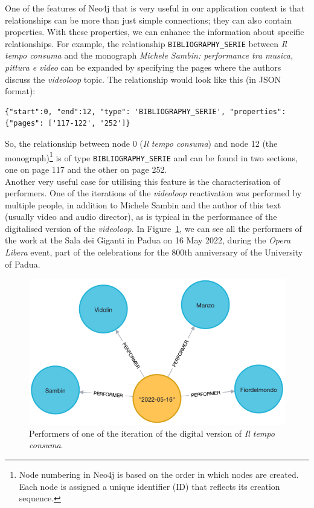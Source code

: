 One of the features of Neo4j that is very useful in our application context is that relationships can be more than just simple connections; they can also contain properties. With these properties, we can enhance the information about specific relationships. For example, the relationship \texttt{BIBLIOGRAPHY\_SERIE} between \textit{Il tempo consuma} and the monograph \textit{Michele Sambin: performance tra musica, pittura e video} \cite{lischi2014michele} can be expanded by specifying the pages where the authors discuss the \textit{videoloop} topic. The relationship would look like this (in JSON format):
\begin{lstlisting}[style=json]
{"start":0, "end":12, "type": 'BIBLIOGRAPHY_SERIE', "properties": {"pages": ['117-122', '252']}
\end{lstlisting}
So, the relationship between node 0 (\textit{Il tempo consuma}) and node 12 (the monograph)\footnote{Node numbering in Neo4j is based on the order in which nodes are created. Each node is assigned a unique identifier (ID) that reflects its creation sequence.} is of type \texttt{BIBLIOGRAPHY\_SERIE} and can be found in two sections, one on page 117 and the other on page 252.\\
Another very useful case for utilising this feature is the characterisation of performers. One of the iterations of the \textit{videoloop} reactivation was performed by multiple people, in addition to Michele Sambin and the author of this text (usually video and audio director), as is typical in the performance of the digitalised version of the \textit{videoloop}. In Figure~\ref{fig:c4-neo4j-performer}, we can see all the performers of the work at the Sala dei Giganti in Padua on 16 May 2022, during the \textit{Opera Libera} event, part of the celebrations for the 800th anniversary of the University of Padua.

\begin{figure}[!h]
    \centering
    \includegraphics[width=0.75\linewidth]{chapters/4-MDC_model_application/image/neo4j-performer.png}
    \caption{Performers of one of the iteration of the digital version of \textit{Il tempo consuma}.}
    \label{fig:c4-neo4j-performer}
\end{figure}

